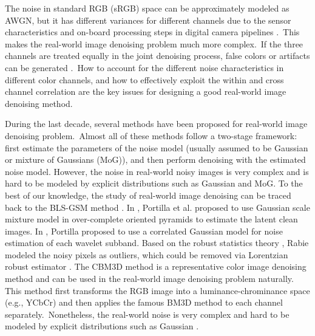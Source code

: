 The noise in standard RGB (sRGB) space can be approximately modeled as AWGN, but it has different variances for different channels \cite{Liu2008,Leungtip,crosschannel2016} due to the sensor characteristics and on-board processing steps in digital camera pipelines \cite{crosschannel2016,karaimer_brown_ECCV_2016}.\ This makes the real-world image denoising problem much more complex.\ If the three channels are treated equally in the joint denoising process, false colors or artifacts can be generated \cite{mairal2008sparse}.\ How to account for the different noise characteristics in different color channels, and how to effectively exploit the within and cross channel correlation are the key issues for designing a good real-world image denoising method.

During the last decade, several methods \cite{blsgsm,fullyblind,huber2011robust,rabie2005robust,cbm3d,Liu2008,noiseclinic,Zhu_2016_CVPR,
crosschannel2016,neatimage} have been proposed for real-world image denoising problem.\ Almost all of these methods follow a two-stage framework: first estimate the parameters of the noise model (usually assumed to be Gaussian or mixture of Gaussians (MoG)), and then perform denoising with the estimated noise model. However, the noise in real-world noisy images is very complex and is hard to be modeled by explicit distributions such as Gaussian and MoG. To the best of our knowledge, the study of real-world image denoising can be traced back to the BLS-GSM method \cite{blsgsm}. In \cite{blsgsm}, Portilla et al. proposed to use Gaussian scale mixture model in over-complete oriented pyramids to estimate the latent clean images. In \cite{fullyblind}, Portilla proposed to use a correlated Gaussian model for noise estimation of each wavelet subband. Based on the robust statistics theory \cite{huber2011robust}, Rabie modeled the noisy pixels as outliers, which could be removed via Lorentzian robust estimator \cite{rabie2005robust}. The CBM3D method \cite{cbm3d} is a representative color image denoising method and can be used in the real-world image denoising problem naturally. This method first transforms the RGB image into a luminance-chrominance space (e.g., YCbCr) and then applies the famous BM3D method \cite{bm3d} to each channel separately.\ Nonetheless, the real-world noise is very complex and hard to be modeled by
explicit distributions such as Gaussian \cite{healey1994radiometric}.


